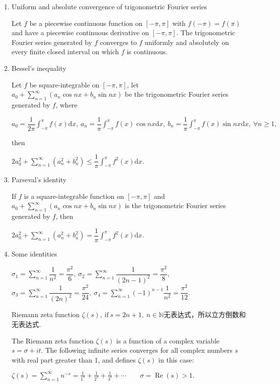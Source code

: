 \documentclass[UTF8]{ctexart}
\numberwithin{equation}{section}
\numberwithin{figure}{section}
\numberwithin{table}{section}
\newcommand\dif{\mathrm{d}}
\newcommand\dis{\displaystyle}
\newcommand\ls{\leqslant}
\newcommand\gs{\geqslant}
\newcommand\sumn{\dis\sum\limits_{n=1}^{\infty}}
\newcommand\intd{\dis\int}
\begin{document}
\begin{spacing}{2}
\begin{enumerate}[itemindent=1.4em, label=(\arabic*)]
\item \textcolor[rgb]{1,0,0}{Uniform and absolute convergence of trigonometric Fourier series}

Let $f$ be a piecewise continuous function on $[−\pi, \pi]$ with $f(−\pi) = f(\pi)$ and have a piecewise continuous derivative on $[−\pi, \pi]$. The trigonometric Fourier series generated by $f$ converges to $f$ uniformly and absolutely on every finite closed interval on which $f$ is continuous.

\item \textcolor[rgb]{1,0,0}{Bessel's inequality}

Let $f$ be square-integrable on $[−\pi, \pi]$, let $\dis a_0+\sumn(a_n\cos nx+b_n\sin nx)$
 be the trigonometric Fourier series generated by $f$, where

\centerline{\textcolor[rgb]{0,0,1}{$a_0=\dfrac{1}{2\pi}\intd_{-\pi}^{\pi}f(x)\dif x,\ 
a_n=\dfrac{1}{\pi}\intd_{-\pi}^{\pi}f(x)\cos nx\dif x,\ 
b_n=\dfrac{1}{\pi}\intd_{-\pi}^{\pi}f(x)\sin nx\dif x,\ 
\forall n\gs1,$}}

then

\centerline{\textcolor[rgb]{0,0,1}{$2a_0^2+\sumn \left(a_n^2+b_n^2\right)
\ls\dfrac{1}{\pi}\intd_{-\pi}^{\pi}f^2(x)\dif x.$}}

\item \textcolor[rgb]{1,0,0}{Parseval's identity}

If $f$ is a square-integrable function on $[−\pi, \pi]$ and $\dis a_0+\sumn(a_n\cos nx+b_n\sin nx)$ is the trigonometric Fourier series generated by $f$, then

\centerline{\textcolor[rgb]{0,0,1}{$2a_0^2+\sumn \left(a_n^2+b_n^2\right)
=\dfrac{1}{\pi}\intd_{-\pi}^{\pi}f^2(x)\dif x.$}}

\item Some identities

$\sigma_1=\sumn\dfrac{1}{n^2}=\dfrac{\pi^2}{6},
\ 
\sigma_2=\sumn\dfrac{1}{(2n-1)^2}=\dfrac{\pi^2}{8},\ $
$\sigma_3=\sumn\dfrac{1}{(2n)^2}=\dfrac{\pi^2}{24},
\ 
\sigma_4=\sumn(-1)^{n-1}\dfrac{1}{n^2}=\dfrac{\pi^2}{12}.$

Riemann zeta function $\zeta(s),\ \text{if}\ s=2n+1,\ n\in\mathbb{N}$无表达式，所以立方倒数和无表达式.

The Riemann zeta function $\zeta(s)$ is a function of a complex variable $s =\sigma + it.$   The following infinite series converges for all complex numbers $s$ with real part greater than 1, and defines $\zeta(s)$ in this case:

\centerline{\textcolor[rgb]{0,0,1}{${\displaystyle \zeta (s)=\sum _{n=1}^{\infty }n^{-s}={\frac {1}{1^{s}}}+{\frac {1}{2^{s}}}+{\frac {1}{3^{s}}}+\cdots \qquad \sigma =\operatorname {Re} (s)>1.}$}}


\end{enumerate}
\end{spacing}
\end{document}
